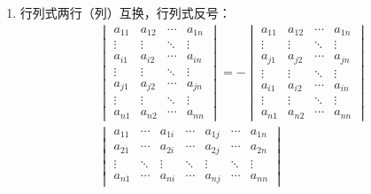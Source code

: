 \begin{property}
\begin{enumerate}
\begin{gather*}
\begin{vmatrix}
				\vdots & \ddots & \vdots & \ddots & \vdots \\
				a_{n1} & \cdots & a_{nj} & \cdots & a_{nn}
			\end{vmatrix}+
			\begin{vmatrix}
				a_{11} & \cdots & a_{1j}' & \cdots & a_{1n} \\
				a_{21} & \cdots & a_{2j}' & \cdots & a_{2n} \\
				\vdots & \ddots & \vdots & \ddots & \vdots \\
				a_{n1} & \cdots & a_{nj}' & \cdots & a_{nn}
			\end{vmatrix}
		\end{gather*}
		\item 行列式两行（列）互换，行列式反号：
		\begin{gather*}
			\begin{vmatrix}
				a_{11} & a_{12} & \cdots & a_{1n} \\
				\vdots & \vdots & \ddots & \vdots \\
				a_{i1} & a_{i2} & \cdots & a_{in} \\
				\vdots & \vdots & \ddots & \vdots \\
				a_{j1} & a_{j2} & \cdots & a_{jn} \\
				\vdots & \vdots & \ddots & \vdots \\
				a_{n1} & a_{n2} & \cdots & a_{nn}
			\end{vmatrix}=-
			\begin{vmatrix}
				a_{11} & a_{12} & \cdots & a_{1n} \\
				\vdots & \vdots & \ddots & \vdots \\
				a_{j1} & a_{j2} & \cdots & a_{jn} \\
				\vdots & \vdots & \ddots & \vdots \\
				a_{i1} & a_{i2} & \cdots & a_{in} \\
				\vdots & \vdots & \ddots & \vdots \\
				a_{n1} & a_{n2} & \cdots & a_{nn}
			\end{vmatrix} \\
			\begin{vmatrix}
				a_{11} & \cdots & a_{1i} & \cdots & a_{1j} & \cdots & a_{1n} \\
				a_{21} & \cdots & a_{2i} & \cdots & a_{2j} & \cdots & a_{2n} \\
				\vdots & \ddots & \vdots & \ddots & \vdots & \ddots & \vdots \\
				a_{n1} & \cdots & a_{ni} & \cdots & a_{nj} & \cdots & a_{nn}

\end{vmatrix}
\end{gather*}
\end{enumerate}
\end{property}
